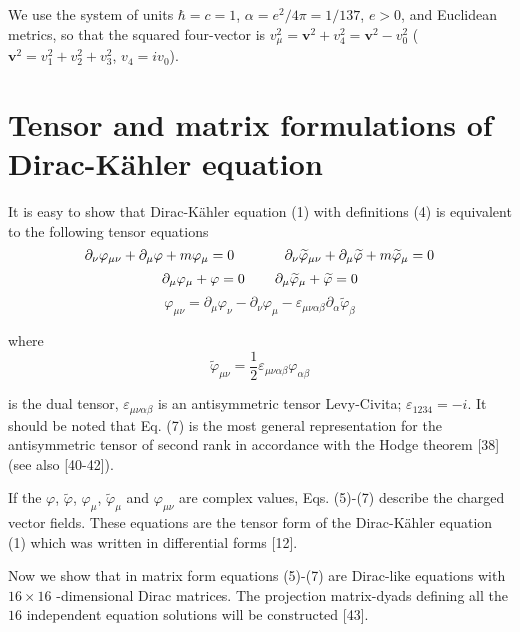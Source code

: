 \documentclass[a4paper,12pt]{article}
\begin{document}
We use the system of units $\hbar =c=1$, $\alpha =e^2/4\pi
=1/137$, $e>0$, and Euclidean metrics, so that the squared
four-vector is $v_\mu ^2=\mathbf{v }^2+v_4^2=\mathbf{v}^2-v_0^2$
($\mathbf{v}^2=v_1^2+v_2^2+v_3^2$, $v_4=iv_0$).

\section{Tensor and matrix formulations of Dirac-K\"ahler
equation}

It is easy to show that Dirac-K\"ahler equation (1) with definitions (4) is
equivalent to the following tensor equations
\begin{equation}
\partial _\nu \varphi _{\mu \nu }+\partial _\mu \varphi +m\varphi _\mu =0
\hspace{0.5in}\partial _\nu \widetilde{\varphi }_{\mu \nu }+\partial _\mu
\widetilde{\varphi }+m\widetilde{\varphi }_\mu =0  \label{5}
\end{equation}
\begin{equation}
\partial _\mu \varphi _\mu +\varphi =0\hspace{0.3in}\partial _\mu \widetilde{
\varphi }_\mu +\widetilde{\varphi }=0  \label{6}
\end{equation}
\begin{equation}
\varphi _{\mu \nu }=\partial _\mu \varphi _\nu -\partial _\nu
\varphi _\mu -\varepsilon _{\mu \nu \alpha \beta }\partial _\alpha
\widetilde{\varphi } _\beta  \label{7}
\end{equation}

where
\begin{equation}
\widetilde{\varphi }_{\mu \nu }=\frac 12\varepsilon _{\mu \nu \alpha \beta
}\varphi _{\alpha \beta }  \label{8}
\end{equation}

is the dual tensor, $\varepsilon _{\mu \nu \alpha \beta }$ is an
antisymmetric tensor Levy-Civita; $\varepsilon _{1234}=-i$. It should be
noted that Eq. (7) is the most general representation for the antisymmetric
tensor of second rank in accordance with the Hodge theorem [38] (see also
[40-42]).

If the $\varphi $, $\widetilde{\varphi }$, $\varphi _\mu $,
$\widetilde{ \varphi }_\mu $ and $\varphi _{\mu \nu }$ are complex
values, Eqs. (5)-(7) describe the charged vector fields. These
equations are the tensor form of the Dirac-K\"ahler equation (1)
which was written in differential forms [12].

Now we show that in matrix form equations (5)-(7) are Dirac-like equations
with $16\times 16$ -dimensional Dirac matrices. The projection matrix-dyads
defining all the $16$ independent equation solutions will be constructed
[43].
\end{document}

